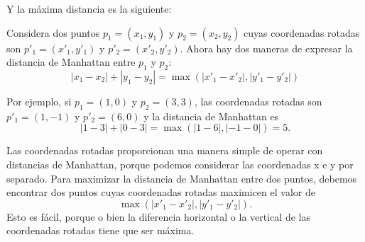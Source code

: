 \begin{center}
\end{center}
Y la máxima distancia es la siguiente:
\begin{center}
\end{center}

Considera dos puntos $p_1=(x_1,y_1)$ y $p_2=(x_2,y_2)$ cuyas coordenadas
rotadas son $p'_1=(x'_1,y'_1)$ y $p'_2=(x'_2,y'_2)$.
Ahora hay dos maneras de expresar la distancia de Manhattan
entre $p_1$ y $p_2$:
\[|x_1-x_2|+|y_1-y_2| = \max(|x'_1-x'_2|,|y'_1-y'_2|)\]

Por ejemplo, si $p_1=(1,0)$ y $p_2=(3,3)$,
las coordenadas rotadas son $p'_1=(1,-1)$ y $p'_2=(6,0)$
y la distancia de Manhattan es
\[|1-3|+|0-3| = \max(|1-6|,|-1-0|) = 5.\]

Las coordenadas rotadas proporcionan una manera simple
de operar con distancias de Manhattan, porque podemos
considerar las coordenadas x e y por separado.
Para maximizar la distancia de Manhattan entre dos puntos,
debemos encontrar dos puntos cuyas
coordenadas rotadas maximicen el valor de
\[\max(|x'_1-x'_2|,|y'_1-y'_2|).\]
Esto es fácil, porque o bien la diferencia horizontal o la vertical
de las coordenadas rotadas tiene que ser máxima.
